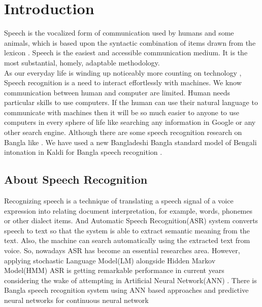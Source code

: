 \documentclass{standalone}
\begin{document}
\chapter{Introduction}

Speech is the vocalized form of communication used by humans and some animals, which is based upon the syntactic combination of items drawn from the lexicon \cite{rahman2003continuous}. Speech is the easiest and accessible communication medium. It is the most substantial, homely, adaptable methodology.
\\
As our everyday life is winding up noticeably more counting on technology \cite{karim2002recognition}, Speech recognition is a need to interact effortlessly with machines. We know communication between human and computer are limited. Human needs particular skills to use computers. If the human can use their natural language to communicate with machines then it will be so much easier to anyone to use computers in every sphere of life like searching any information in Google or any other search engine. Although there are some speech recognition research on Bangla like \cite{mohamed2012acoustic, islam2009research, hasnat2007isolated}. We have used a new Bangladeshi Bangla standard  model of Bengali intonation in Kaldi for Bangla speech recognition \cite{khan2016intonation}.

\section{About Speech Recognition}
Recognizing speech is a technique of translating a speech signal of a voice expression into
relating document interpretation, for example, words, phonemes or other dialect items. And Automatic Speech Recognition(ASR) system \cite{huang2014historical, sinha2014speech} converts speech to text so that the system is able to extract semantic meaning from the text. Also, the machine can search automatically using the extracted text from voice. So, nowadays ASR has become an essential researches area. However, applying stochastic Language Model(LM) \cite{kuhn1990cache} alongside Hidden Markov Model(HMM) \cite{mohamed2012acoustic} ASR is getting remarkable performance in current years considering the wake of attempting in Artificial Neural Network(ANN) \cite{dahl2012context}. There is Bangla speech recognition system using ANN based approaches and predictive neural networks for continuous neural network \cite{paul2009bangla, zahner1995artificial, tebelskis1991continuous}
\end{document}
